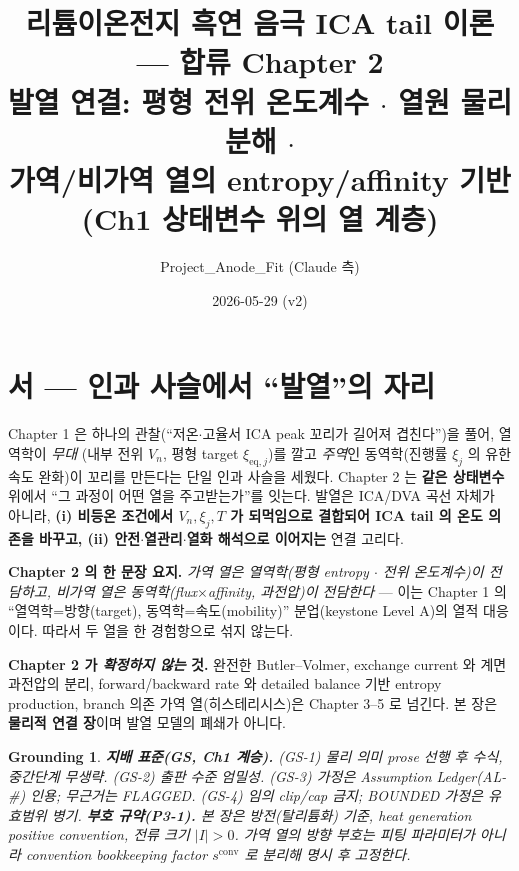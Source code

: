 \documentclass[11pt,a4paper]{article}
\title{\textbf{리튬이온전지 흑연 음극 ICA tail 이론 — 합류 Chapter 2}\\[0.4em]
\large 발열 연결: 평형 전위 온도계수 $\cdot$ 열원 물리 분해 $\cdot$\\
가역/비가역 열의 entropy/affinity 기반 (Ch1 상태변수 위의 열 계층)}
\author{Project\_Anode\_Fit (Claude 측)}
\date{2026-05-29 (v2)}
\newtheorem*{groundingbox}{Grounding}
\newcommand{\eq}{\mathrm{eq}}
\newcommand{\conv}{\mathrm{conv}}
\begin{document}
\maketitle

\section*{서 — 인과 사슬에서 ``발열''의 자리}
Chapter 1 은 하나의 관찰(``저온$\cdot$고율서 ICA peak 꼬리가 길어져 겹친다'')을 풀어, 열역학이 \emph{무대}
(내부 전위 $V_n$, 평형 target $\xi_{\eq,j}$)를 깔고 \emph{주역}인 동역학(진행률 $\xi_j$ 의 유한속도 완화)이
꼬리를 만든다는 단일 인과 사슬을 세웠다. Chapter 2 는 \textbf{같은 상태변수} 위에서 ``그 과정이 어떤 열을
주고받는가''를 잇는다. 발열은 ICA/DVA 곡선 자체가 아니라, \textbf{(i) 비등온 조건에서 $V_n,\xi_j,T$ 가
되먹임으로 결합되어 ICA tail 의 온도 의존을 바꾸고, (ii) 안전$\cdot$열관리$\cdot$열화 해석으로 이어지는}
연결 고리다.

\textbf{Chapter 2 의 한 문장 요지.} \emph{가역 열은 열역학(평형 entropy $\cdot$ 전위 온도계수)이 전담하고,
비가역 열은 동역학(flux$\times$affinity, 과전압)이 전담한다} — 이는 Chapter 1 의 ``열역학=방향(target),
동역학=속도(mobility)'' 분업(keystone Level A)의 열적 대응이다. 따라서 두 열을 한 경험항으로 섞지 않는다.

\textbf{Chapter 2 가 \emph{확정하지 않는} 것.} 완전한 Butler--Volmer, exchange current 와 계면 과전압의
분리, forward/backward rate 와 detailed balance 기반 entropy production, branch 의존 가역 열(히스테리시스)은
Chapter 3--5 로 넘긴다. 본 장은 \textbf{물리적 연결 장}이며 발열 모델의 폐쇄가 아니다.

\begin{groundingbox}
\textbf{지배 표준(GS, Ch1 계승).} (GS-1) 물리 의미 prose 선행 후 수식, 중간단계 무생략. (GS-2) 출판 수준
엄밀성. (GS-3) 가정은 Assumption Ledger(AL-\#) 인용; 무근거는 FLAGGED. (GS-4) 임의 clip/cap 금지;
BOUNDED 가정은 유효범위 병기. \textbf{부호 규약(P3-1).} 본 장은 \emph{방전(탈리튬화) 기준}, heat generation
positive convention, 전류 크기 $|I|>0$. 가역 열의 방향 부호는 피팅 파라미터가 아니라 convention
bookkeeping factor $s^{\conv}$ 로 분리해 명시 후 고정한다.
\end{groundingbox}

\tableofcontents
\newpage

\end{document}
